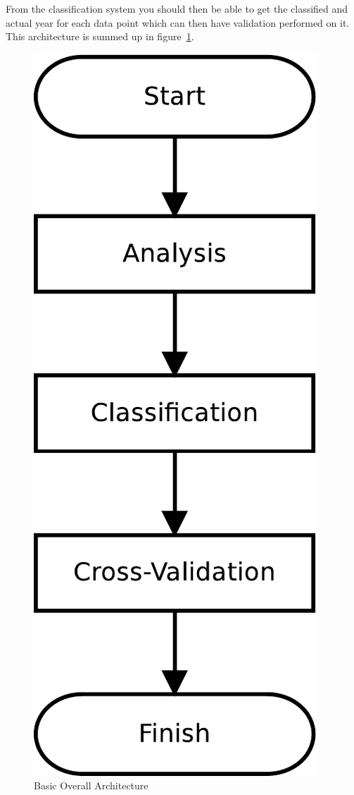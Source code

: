 From the classification system you should then be able to get the classified and actual year for
each data point which can then have validation performed on it. This architecture is summed up in
figure~\ref{fig:basic-arch}.

\begin{figure}[h]
\includegraphics[width=\linewidth]{img/basic-arch}
\caption{Basic Overall Architecture}\label{fig:basic-arch}
\end{figure}

